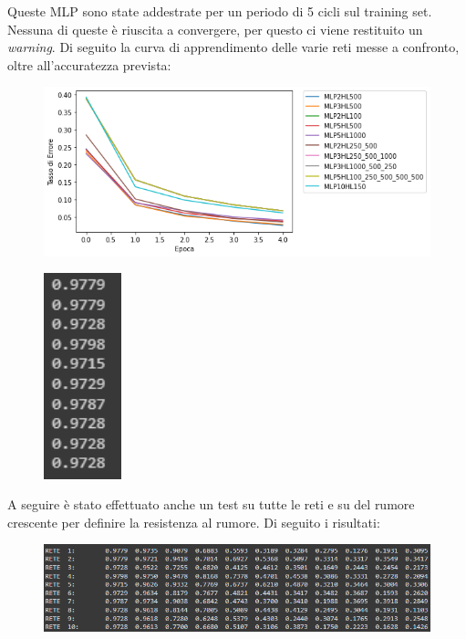 \documentclass[12pt, a4paper]{article}
\begin{document}
Queste MLP sono state addestrate per un periodo di 5 cicli sul training set. Nessuna di queste è riuscita a convergere, per questo ci viene restituito un \textit{warning}. Di seguito la curva di apprendimento delle varie reti messe a confronto, oltre all'accuratezza prevista:
\begin{figure}[H]
    \centering 
    \includegraphics[width=\textwidth]{ConfrontoClassica.png}
\end{figure}
\begin{figure}[H]
    \centering
    \includegraphics[width=0.2\textwidth]{AccuratezzaClassica.png}
\end{figure}

A seguire è stato effettuato anche un test su tutte le reti e su del rumore crescente per definire la resistenza al rumore. Di seguito i risultati:
\begin{figure}[H]
    \centering
    \includegraphics[width=\textwidth]{RisultatiRumoreClassica.png}
\end{figure}
\end{document}
